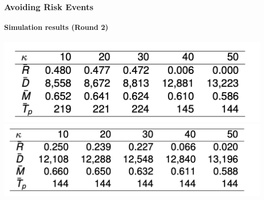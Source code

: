 \documentclass[UKenglish]{beamer}
\begin{document}
\begin{frame}
\frametitle{Avoiding Risk Events}
\framesubtitle{Simulation results (Round 2)}
\includegraphics[width=\textwidth]{MathDept-images/simul_risk_av.png}
\pause 
\includegraphics[width=\textwidth]{MathDept-images/simul_risk.png}
\end{frame}
\end{document}

